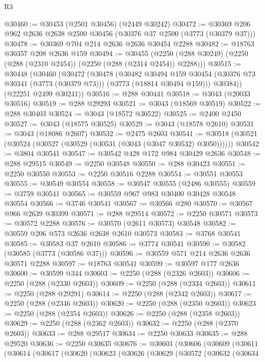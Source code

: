 \begin{lexlean}{R3}
\begin{coremodule}
@30460 := @30453 (@2501 @30456) (@2449 @30242)
@30472 := @30369 @206 @962 @2636 @2638 @2500 @30456 (@30376 @37 @2500 (@3773 (@30379 @37)))
@30478 := @30369 @704 @214 @2636 @2636 @30454 @2288
@30482 := @18763 @30357 @208 @2636 @159
@30494 := @30455
    (@2250 (@288 @30249) (@2250 (@288 (@2310 @2454)) (@2250 (@288 (@2314 @2454)) @2288)))
@30515 := @30448
    (@30460
      (@30472
        (@30478
          (@30482
            @30494
            @159
            @30454
            (@30376 @73 @30341 (@3773 (@30379 @73)))
            (@3773 (@18814 @30494 @159)))
          @30384))
      (@22251 @2499 @30241))
@30516 := @288 @30441
@30518 := @3043 (@20033 @30516)
@30519 := @288 @29293
@30521 := @3043 (@18569 @30519)
@30522 := @288 @30403
@30524 := @3043 (@18572 @30522)
@30525 := @2400 @2450
@30527 := @3043 (@18575 @30525)
@30529 := @3043 (@18578 @2610)
@30531 := @3043 (@18086 @2607)
@30532 := @2475 @2603
@30541 := @30518 (@30521 (@30524 (@30527 (@30529 (@30531 (@3043 (@3047 @30532) @3050))))))
@30542 := @3804 @30541
@30547 := @30542 @428 @172 @984 @30429 @2636
@30548 := @288 @29515
@30549 := @2250 @30548
@30550 := @288 @30423
@30551 := @2250 @30550
@30553 := @2250 @30516 @2288
@30554 := @30551 @30553
@30555 := @30549 @30554
@30558 := @30547 @30555 (@2486 @30555)
@30559 := @3759 @30541
@30565 := @30559 @967 @983 @30400 @30428 @30548 @30554
@30566 := @3746 @30541
@30567 := @30566 @280
@30570 := @30567 @966 @2639 @30399
@30571 := @288 @29514
@30572 := @2250 @30571
@30573 := @30572 @2288
@30576 := @30570 (@2611 @30573) @30548
@30582 := @30559 @206 @573 @2636 @2638 @2610 @30573
@30583 := @3768 @30541
@30585 := @30583 @37 @2610
@30586 := @3774 @30541
@30590 := @30582 (@30585 (@3773 (@30586 @37)))
@30596 := @30559 @571 @214 @2636 @2636 @30571 @2288
@30597 := @18763 @30541
@30599 := @30597 @177 @2636
@30600 := @30599 @344
@30603 := @2250 (@288 (@2326 @2603))
@30606 := @2250 (@288 (@2330 @2603))
@30609 := @2250 (@288 (@2334 @2603))
@30611 := @2250 (@288 @29291)
@30614 := @2250 (@288 (@2342 @2603))
@30617 := @2250 (@288 (@2346 @2603))
@30620 := @2250 (@288 (@2350 @2603))
@30623 := @2250 (@288 (@2354 @2603))
@30626 := @2250 (@288 (@2358 @2603))
@30629 := @2250 (@288 (@2362 @2603))
@30632 := @2250 (@288 (@2370 @2603))
@30633 := @288 @29517
@30634 := @2250 @30633
@30635 := @288 @29520
@30636 := @2250 @30635
@30676 := @30603
    (@30606
      (@30609
        (@30611
          (@30614
            (@30617
              (@30620
                (@30623
                  (@30626
                    (@30629
                      (@30572
                        (@30632
                          (@30634

\end{coremodule}
\end{lexlean}
